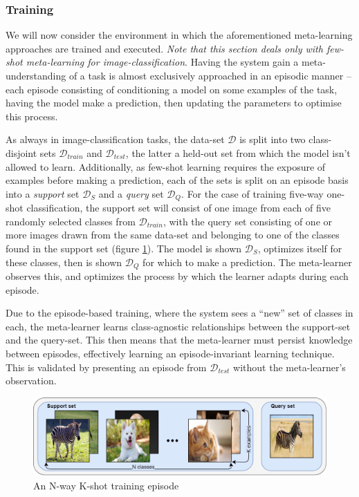 \documentclass{report}
\begin{document}
\subsubsection{Training}
We will now consider the environment in which the aforementioned meta-learning approaches are trained and executed. \textit{Note that this section deals only with few-shot meta-learning for image-classification}. Having the system gain a meta-understanding of a task is almost exclusively approached in an episodic manner -- each episode consisting of conditioning a model on some examples of the task, having the model make a prediction, then updating the parameters to optimise this process. \par
As always in image-classification tasks, the data-set $\mathcal{D}$ is split into two class-disjoint sets $\mathcal{D}_{train}$ and $\mathcal{D}_{test}$, the latter a held-out set from which the model isn't allowed to learn. Additionally, as few-shot learning requires the exposure of examples before making a prediction, each of the sets is split on an episode basis into a \textit{support} set $\mathcal{D}_{S}$ and a \textit{query} set $\mathcal{D}_{Q}$. For the case of training five-way one-shot classification, the support set will consist of one image from each of five randomly selected classes from $\mathcal{D}_{train}$, with the query set consisting of one or more images drawn from the same data-set and belonging to one of the classes found in the support set (figure \ref{fig:episode:1}). The model is shown $\mathcal{D}_S$, optimizes itself for these classes, then is shown $\mathcal{D}_Q$ for which to make a prediction. The meta-learner observes this, and optimizes the process by which the learner adapts during each episode. \par
Due to the episode-based training, where the system sees a ``new'' set of classes in each, the meta-learner learns class-agnostic relationships between the support-set and the query-set. This then means that the meta-learner must persist knowledge between episodes, effectively learning an episode-invariant learning technique. This is validated by presenting an episode from $\mathcal{D}_{test}$ without the meta-learner's observation. \par
\begin{figure}[!h]
 \centering
 \includegraphics[width=14cm]{episode}
 \caption{An N-way K-shot training episode}
 \label{fig:episode:1}
\end{figure}
\end{document}
